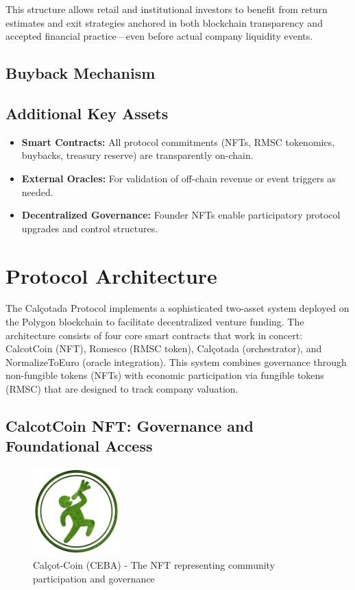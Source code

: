 \documentclass[conference]{IEEEtran}
\begin{document}
This structure allows retail and institutional investors to benefit from return estimates and exit strategies anchored in both blockchain transparency and accepted financial practice—even before actual company liquidity events.

\subsection{Buyback Mechanism}


\subsection{Additional Key Assets}
\begin{itemize}
    \item \textbf{Smart Contracts:} All protocol commitments (NFTs, RMSC tokenomics, buybacks, treasury reserve) are transparently on-chain.
    \item \textbf{External Oracles:} For validation of off-chain revenue or event triggers as needed.
    \item \textbf{Decentralized Governance:} Founder NFTs enable participatory protocol upgrades and control structures.
\end{itemize}

\section{Protocol Architecture}



The Calçotada Protocol implements a sophisticated two-asset system deployed on the Polygon blockchain to facilitate decentralized venture funding. The architecture consists of four core smart contracts that work in concert: CalcotCoin (NFT), Romesco (RMSC token), Calçotada (orchestrator), and NormalizeToEuro (oracle integration). This system combines governance through non-fungible tokens (NFTs) with economic participation via fungible tokens (RMSC) that are designed to track company valuation.

\subsection{CalcotCoin NFT: Governance and Foundational Access}

\begin{figure}[ht]
\centering
\includegraphics[width=0.3\textwidth]{calcot-coin-logo.png}
\caption{Calçot-Coin (CEBA) - The NFT representing community participation and governance}
\label{fig:calcotcoin-logo}
\end{figure}
\end{document}
